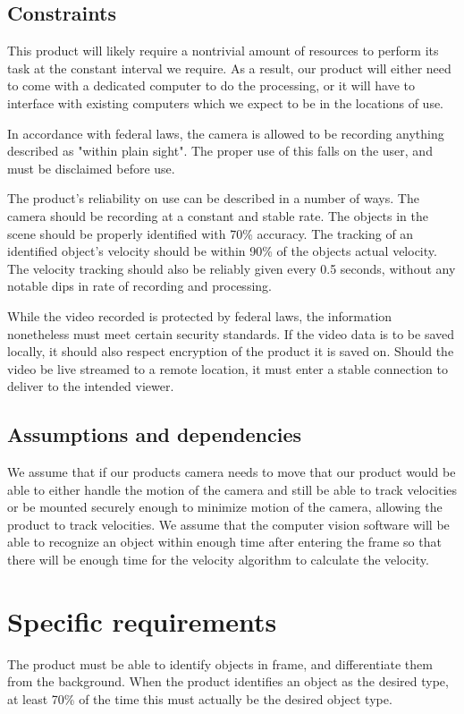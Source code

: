 \documentclass[letterpaper,10pt,onecolumn,draftclsnofoot]{IEEEtran}
\begin{document}
\subsection{Constraints}
This product will likely require a nontrivial amount of resources to perform its task at the constant interval we require.
As a result, our product will either need to come with a dedicated computer to do the processing, or it will have to interface with existing computers which we expect to be in the locations of use.

In accordance with federal laws, the camera is allowed to be recording anything described as "within plain sight".
The proper use of this falls on the user, and must be disclaimed before use.

The product's reliability on use can be described in a number of ways.
The camera should be recording at a constant and stable rate.
The objects in the scene should be properly identified with 70\% accuracy.
The tracking of an identified object's velocity should be within 90\% of the objects actual velocity.
The velocity tracking should also be reliably given every 0.5 seconds, without any notable dips in rate of recording and processing.

While the video recorded is protected by federal laws, the information nonetheless must meet certain security standards.
If the video data is to be saved locally, it should also respect encryption of the product it is saved on.
Should the video be live streamed to a remote location, it must enter a stable connection to deliver to the intended viewer.

\subsection{Assumptions and dependencies}
We assume that if our products camera needs to move that our product would be able to either handle the motion of the camera and still be able to track velocities or be mounted securely enough to minimize motion of the camera, allowing the product to track velocities.
We assume that the computer vision software will be able to recognize an object within enough time after entering the frame so that there will be enough time for the velocity algorithm to calculate the velocity.

\section{Specific requirements}
The product must be able to identify objects in frame, and differentiate them from the background.
When the product identifies an object as the desired type, at least 70\% of the time this must actually be the desired object type.
\end{document}
